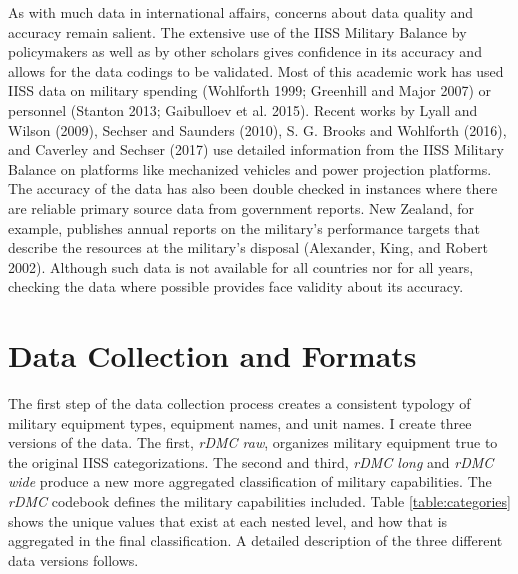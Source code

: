 \documentclass[
]{article}
\begin{document}
As with much data in international affairs, concerns about data quality and accuracy remain salient. The extensive use of the IISS Military Balance by policymakers as well as by other scholars gives confidence in its accuracy and allows for the data codings to be validated. Most of this academic work has used IISS data on military spending (Wohlforth 1999; Greenhill and Major 2007) or personnel (Stanton 2013; Gaibulloev et al. 2015). Recent works by Lyall and Wilson (2009), Sechser and Saunders (2010), S. G. Brooks and Wohlforth (2016), and Caverley and Sechser (2017) use detailed information from the IISS Military Balance on platforms like mechanized vehicles and power projection platforms. The accuracy of the data has also been double checked in instances where there are reliable primary source data from government reports. New Zealand, for example, publishes annual reports on the military's performance targets that describe the resources at the military's disposal (Alexander, King, and Robert 2002). Although such data is not available for all countries nor for all years, checking the data where possible provides face validity about its accuracy.

\hypertarget{data-collection-and-formats}{%
\section{Data Collection and Formats}\label{data-collection-and-formats}}

The first step of the data collection process creates a consistent typology of military equipment types, equipment names, and unit names. I create three versions of the data. The first, \emph{rDMC raw}, organizes military equipment true to the original IISS categorizations. The second and third, \emph{rDMC long} and \emph{rDMC wide} produce a new more aggregated classification of military capabilities. The \emph{rDMC} codebook defines the military capabilities included. Table \ref{table:categories} shows the unique values that exist at each nested level, and how that is aggregated in the final classification. A detailed description of the three different data versions follows.
\end{document}
